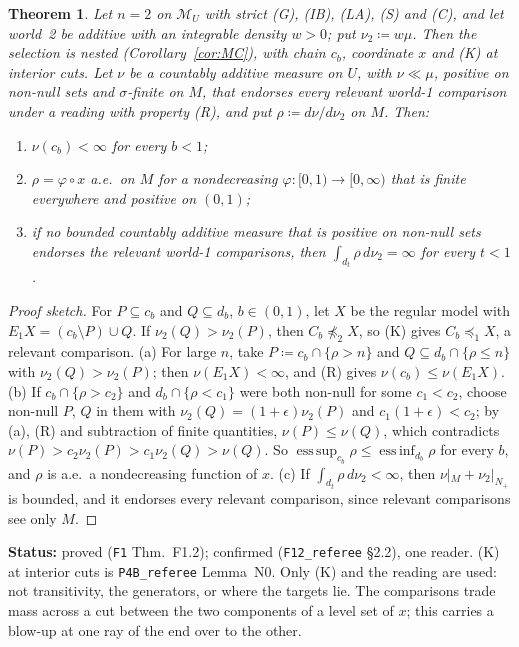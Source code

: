 \documentclass[11pt]{article}
\newtheorem{theorem}{Theorem}[section]
\theoremstyle{definition}
\theoremstyle{remark}
\newcommand{\M}{\mathcal M}
\newcommand{\src}[1]{\texttt{#1}}
\newcommand{\status}[1]{\par\smallskip\noindent\textbf{Status:} #1\par\smallskip}
\begin{document}
\begin{theorem}\label{thm:F12}
Let $n=2$ on $\M_U$ with strict (G), (IB), (LA), (S) and (C), and let world~2 be additive with an integrable density $w>0$; put $\nu_2\coloneqq w\mu$. Then the selection is nested (Corollary~\ref{cor:MC}), with chain $c_b$, coordinate $x$ and (K) at interior cuts. Let $\nu$ be a countably additive measure on $U$, with $\nu\ll\mu$, positive on non-null sets and $\sigma$-finite on $M$, that endorses every relevant world-1 comparison under a reading with property (R), and put $\rho\coloneqq d\nu/d\nu_2$ on $M$. Then:
\begin{enumerate}[leftmargin=*,label=(\alph*)]
\item $\nu(c_b)<\infty$ for every $b<1$;
\item $\rho=\varphi\circ x$ a.e.\ on $M$ for a nondecreasing $\varphi:[0,1)\to[0,\infty)$ that is finite everywhere and positive on $(0,1)$;
\item if no bounded countably additive measure that is positive on non-null sets endorses the relevant world-1 comparisons, then $\int_{d_t}\rho\,d\nu_2=\infty$ for every $t<1$.
\end{enumerate}
\end{theorem}
\begin{proof}[Proof sketch]
For $P\subseteq c_b$ and $Q\subseteq d_b$, $b\in(0,1)$, let $X$ be the regular model with $E_1X=(c_b\setminus P)\cup Q$. If $\nu_2(Q)>\nu_2(P)$, then $C_b\not\preceq_2X$, so (K) gives $C_b\preceq_1X$, a relevant comparison. (a) For large $n$, take $P\coloneqq c_b\cap\{\rho>n\}$ and $Q\subseteq d_b\cap\{\rho\le n\}$ with $\nu_2(Q)>\nu_2(P)$; then $\nu(E_1X)<\infty$, and (R) gives $\nu(c_b)\le\nu(E_1X)$. (b) If $c_b\cap\{\rho>c_2\}$ and $d_b\cap\{\rho<c_1\}$ were both non-null for some $c_1<c_2$, choose non-null $P$, $Q$ in them with $\nu_2(Q)=(1+\epsilon)\nu_2(P)$ and $c_1(1+\epsilon)<c_2$; by (a), (R) and subtraction of finite quantities, $\nu(P)\le\nu(Q)$, which contradicts $\nu(P)>c_2\nu_2(P)>c_1\nu_2(Q)>\nu(Q)$. So $\operatorname{ess\,sup}_{c_b}\rho\le\operatorname{ess\,inf}_{d_b}\rho$ for every $b$, and $\rho$ is a.e.\ a nondecreasing function of $x$. (c) If $\int_{d_t}\rho\,d\nu_2<\infty$, then $\nu|_M+\nu_2|_{N_+}$ is bounded, and it endorses every relevant comparison, since relevant comparisons see only $M$.
\end{proof}
\status{proved (\src{F1} Thm.~F1.2); confirmed (\src{F12\_referee} \S2.2), one reader. (K) at interior cuts is \src{P4B\_referee} Lemma~N0. Only (K) and the reading are used: not transitivity, the generators, or where the targets lie. The comparisons trade mass across a cut between the two components of a level set of $x$; this carries a blow-up at one ray of the end over to the other.}
\end{document}
